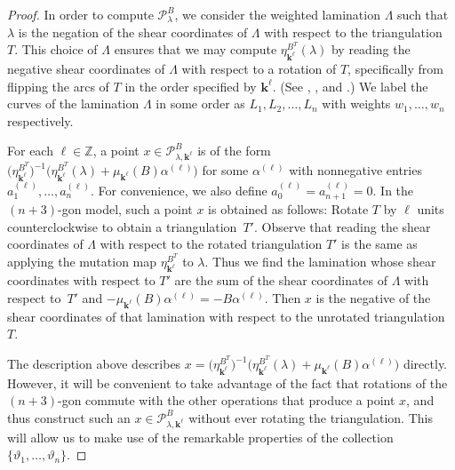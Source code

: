 \documentclass{amsart}
\theoremstyle{definition}
\theoremstyle{remark}
\numberwithin{equation}{section}
\newcommand{\integers}{\mathbb Z}
\newcommand{\thet}{\vartheta}
\newcommand{\set}[1]{{\lbrace #1 \rbrace}}
\newcommand{\0}{{\mathbf{0}}}
\newcommand{\kk}{{\boldsymbol{k}}}
\renewcommand{\P}{\mathcal{P}}
\begin{document}
\begin{proof}
In order to compute $\P^B_\lambda$, we consider the weighted lamination $\Lambda$ such that $\lambda$ is the negation of the shear coordinates of $\Lambda$ with respect to the triangulation~$T$.
This choice of $\Lambda$ ensures that we may compute $\eta^{B^T}_{\kk^\ell}(\lambda)$ by reading the negative shear coordinates of $\Lambda$ with respect to a rotation of $T$, specifically from flipping the arcs of $T$ in the order specified by $\kk^\ell$.
(See \cite[Theorem~12.6]{cats2}, \cite[Theorem~4.3]{unisurface}, and \cite[Section~5]{unisurface}.)
We label the curves of the lamination $\Lambda$ in some order as $L_1,L_2,\ldots,L_n$ with weights $w_1,\ldots,w_n$ respectively.

For each $\ell\in\integers$, a point $x\in \P^B_{\lambda,\kk^\ell}$ is of the form $\bigl(\eta_{\kk^\ell}^{B^T}\bigr)^{-1}\bigl(\eta_{\kk^\ell}^{B^T}(\lambda)+\mu_{\kk^\ell}(B)\alpha^{(\ell)}\bigr)$ for some $\alpha^{(\ell)}$ with nonnegative entries $a_1^{(\ell)},\ldots,a_n^{(\ell)}$.
For convenience, we also define $a_0^{(\ell)}=a_{n+1}^{(\ell)}=0$.
In the $(n+3)$-gon model, such a point $x$ is obtained as follows:
Rotate $T$ by $\ell$ units counterclockwise to obtain a triangulation~$T'$.
Observe that reading the shear coordinates of $\Lambda$ with respect to the rotated triangulation $T'$ is the same as applying the mutation map $\eta^{B^T}_{\kk^\ell}$ to $\lambda$.
Thus we find the lamination whose shear coordinates with respect to $T'$ are the sum of the shear coordinates of $\Lambda$ with respect to~$T'$ and $-\mu_{\kk^\ell}(B)\alpha^{(\ell)}=-B\alpha^{(\ell)}$.
Then $x$ is the negative of the shear coordinates of that lamination with respect to the unrotated triangulation~$T$.

The description above describes ${x=\bigl(\eta_{\kk^\ell}^{B^T}\bigr)^{-1}\bigl(\eta_{\kk^\ell}^{B^T}(\lambda)+\mu_{\kk^\ell}(B)\alpha^{(\ell)}}\bigr)$ directly.
However, it will be convenient to take advantage of the fact that rotations of the $(n+3)$-gon commute with the other operations that produce a point $x$, and thus construct such an $x\in \P^B_{\lambda,\kk^\ell}$ without ever rotating the triangulation.
This will allow us to make use of the remarkable properties of the collection $\set{\thet_1,\ldots,\thet_n}$.


\end{proof}
\end{document}
